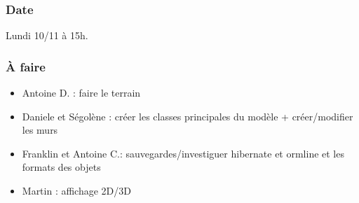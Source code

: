 \documentclass[12pt,a4paper]{article}
\begin{document}
		\subsubsection{Date}
			Lundi 10/11 à 15h.
			
		\subsubsection{À faire}
			\begin{itemize}
				\item Antoine D. : faire le terrain
				\item Daniele et Ségolène : créer les classes principales du modèle + créer/modifier les murs
				\item Franklin et Antoine C.: sauvegardes/investiguer hibernate et ormline et les formats des objets
				\item Martin : affichage 2D/3D 
			\end{itemize}
\end{document}
